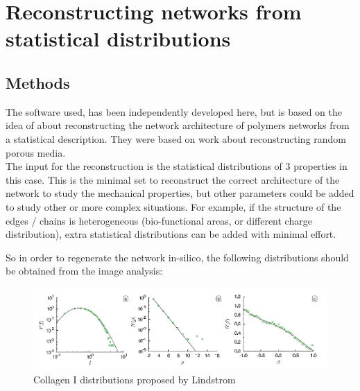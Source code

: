 
\chapter{Reconstructing networks from statistical distributions} %

\label{Chapter-Reconstruction} %



\section{Methods}

The  software used, has been independently developed here, but is based on the
idea of \citet{lindstrom_biopolymer_2010} about reconstructing the network
architecture of polymers networks from a statistical description. They were
based on \citet{yeong_reconstructing_1998,yeong_reconstructing_1998-1} work
about  reconstructing random porous media.\\
The input for the reconstruction is the
statistical distributions of $3$ properties in this case. This is the minimal
set to reconstruct the correct architecture of the network to study the
mechanical properties, but other parameters could be added to study other or
more complex situations.  For example, if the structure of the edges / chains is
heterogeneous  (bio-functional areas, or different charge distribution), extra
statistical distributions can be added with minimal effort.

So in order to regenerate the network in-silico, the following distributions
should be obtained from the image analysis:
\begin{figure}[h!]
\begin{center}
\includegraphics[width=1.0\textwidth]{Figures/chapter-reconstruct/lindstrom-paper-images.png}

\caption[Collagen distributions]{Collagen I distributions proposed by Lindstrom
\citep{lindstrom_biopolymer_2010}}

\end{center}
\end{figure}

